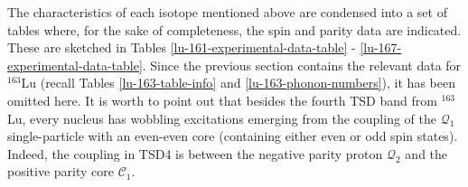 The characteristics of each isotope mentioned above are condensed into a set of tables where, for the sake of completeness, the spin and parity data are indicated. These are sketched in Tables \ref{lu-161-experimental-data-table} - \ref{lu-167-experimental-data-table}. Since the previous section contains the relevant data for $^{163}$Lu (recall Tables \ref{lu-163-table-info} and \ref{lu-163-phonon-numbers}), it has been omitted here. It is worth to point out that besides the fourth TSD band from $^{163}$Lu, every nucleus has wobbling excitations emerging from the coupling of the $\mathcal{Q}_1$ single-particle with an even-even core (containing either even or odd spin states). Indeed, the coupling in TSD4 is between the negative parity proton $\mathcal{Q}_2$ and the positive parity core $\mathscr{C}_1$.
\begin{table}
    \centering
    \caption{The data concerning spin and parity assignments of $^{161}$Lu that are required for evaluating the excitation energies. The wobbling phonon numbers from Eq. \ref{phononic-term-tsd-energies} are shown in the penultimate column. For both bands there is only one single-particle, i.e., $\mathcal{Q}_1$. The even/odd dissimilarity between core states of the two bands are emphasized through the fourth column ($\mathscr{C}$). The band-head $I_b$ for the isotope is also given in the last column.}
    \label{lu-161-experimental-data-table}
\end{table}
